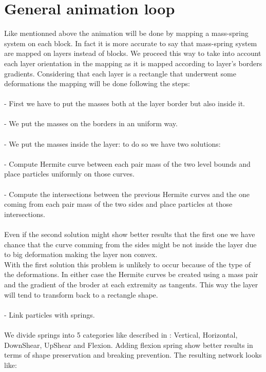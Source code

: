 \documentclass[12pt, a4paper]{memoir} %
\begin{document}
\section{General animation loop}
\label{sec:generalanimation}
Like mentionned above the animation will be done by mapping a mass-spring system on each block. In fact it is more accurate to say that mass-spring system are mapped on layers instead of blocks. We proceed this way to take into account each layer orientation in the mapping as it is mapped according to layer's borders gradients. Considering that each layer is a rectangle that underwent some deformations the mapping will be done following the steps:	\\\\		
\indent	- First we have to put the masses both at the layer border but also inside it.\\\\
\indent	- We put the masses on the borders in an uniform way.\\\\
\indent	- We put the masses inside the layer: to do so we have two solutions:\\\\
\indent \indent	- Compute Hermite curve between each pair mass of the two level bounds and place particles uniformly on those curves.\\\\
\indent \indent	- Compute the intersections between the previous Hermite curves and the one coming from each pair mass of the two sides and place particles at those intersections.\\\\
	Even if the second solution might show better results that the first one we have chance that the curve comming from the sides might be not inside the layer due to big deformation making the layer non convex. \\With the first solution this problem is unlikely to occur because of the type of the deformations. In either case the Hermite curves be created using a mass pair and the gradient of the broder at each extremity as tangents. This way the layer will tend to transform back to a rectangle shape.\\\\
\indent	- Link particles with springs. \\\\We divide springs into 5 categories like described in \cite{cloth}: Vertical, Horizontal, DownShear, UpShear and Flexion. Adding flexion spring show better results in terms of shape preservation and breaking prevention. The resulting network looks like:\\
	
\end{document}
